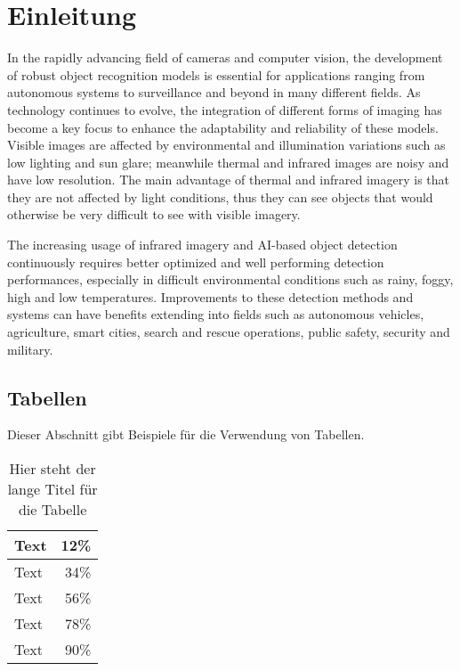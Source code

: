 \chapter{Einleitung}
\label{cha:Einleitung}

In the rapidly advancing field of cameras and computer vision, the development of robust object recognition models is essential for applications ranging from autonomous systems to surveillance and beyond in many different fields. As technology continues to evolve, the integration of different forms of imaging has become a key focus to enhance the adaptability and reliability of these models. Visible images are affected by environmental and illumination variations such as low lighting and sun glare; meanwhile thermal and infrared images are noisy and have low resolution. \cite[p.1]{SystematicReview23} The main advantage of thermal and infrared imagery is that they are not affected by light conditions, thus they can see objects that would otherwise be very difficult to see with visible imagery.

The increasing usage of infrared imagery \cite{InfraredCameraMarket} and AI-based object detection continuously requires better optimized and well performing detection performances, especially in difficult environmental conditions such as rainy, foggy, high and low temperatures. Improvements to these detection methods and systems can have benefits extending into fields such as autonomous vehicles, agriculture, smart cities, search and rescue operations, public safety, security and military. 








\section{Tabellen}
\label{sec:Tabellen}
Dieser Abschnitt gibt Beispiele für die Verwendung von Tabellen.

\begin{table}[ht]
    \vspace{0.5em}
	\centering
	\begin{tabular}{|l|r|}
        \hline
        Text & 12\% \\
        \hline
        Text & 34\% \\
        \hline
        Text & 56\% \\
        \hline
        Text & 78\% \\
        \hline
        Text & 90\% \\
        \hline
	\end{tabular}
	\caption[Kurztitel Tabelle]{Hier steht der lange Titel für die Tabelle}
	\label{tab:tabelle}
	\vspace{0.5em}
\end{table}


